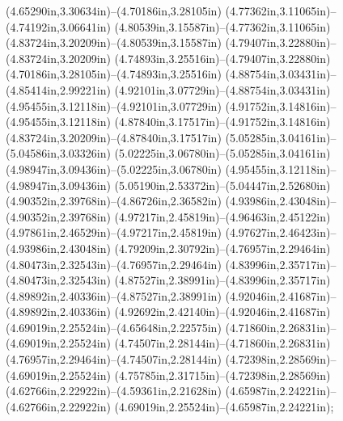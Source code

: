 (4.65290in,3.30634in)--(4.70186in,3.28105in) (4.77362in,3.11065in)--(4.74192in,3.06641in) (4.80539in,3.15587in)--(4.77362in,3.11065in) (4.83724in,3.20209in)--(4.80539in,3.15587in) (4.79407in,3.22880in)--(4.83724in,3.20209in) (4.74893in,3.25516in)--(4.79407in,3.22880in) (4.70186in,3.28105in)--(4.74893in,3.25516in) (4.88754in,3.03431in)--(4.85414in,2.99221in) (4.92101in,3.07729in)--(4.88754in,3.03431in) (4.95455in,3.12118in)--(4.92101in,3.07729in) (4.91752in,3.14816in)--(4.95455in,3.12118in) (4.87840in,3.17517in)--(4.91752in,3.14816in) (4.83724in,3.20209in)--(4.87840in,3.17517in) (5.05285in,3.04161in)--(5.04586in,3.03326in) (5.02225in,3.06780in)--(5.05285in,3.04161in) (4.98947in,3.09436in)--(5.02225in,3.06780in) (4.95455in,3.12118in)--(4.98947in,3.09436in) (5.05190in,2.53372in)--(5.04447in,2.52680in) (4.90352in,2.39768in)--(4.86726in,2.36582in) (4.93986in,2.43048in)--(4.90352in,2.39768in) (4.97217in,2.45819in)--(4.96463in,2.45122in) (4.97861in,2.46529in)--(4.97217in,2.45819in) (4.97627in,2.46423in)--(4.93986in,2.43048in) (4.79209in,2.30792in)--(4.76957in,2.29464in) (4.80473in,2.32543in)--(4.76957in,2.29464in) (4.83996in,2.35717in)--(4.80473in,2.32543in) (4.87527in,2.38991in)--(4.83996in,2.35717in) (4.89892in,2.40336in)--(4.87527in,2.38991in) (4.92046in,2.41687in)--(4.89892in,2.40336in) (4.92692in,2.42140in)--(4.92046in,2.41687in) (4.69019in,2.25524in)--(4.65648in,2.22575in) (4.71860in,2.26831in)--(4.69019in,2.25524in) (4.74507in,2.28144in)--(4.71860in,2.26831in) (4.76957in,2.29464in)--(4.74507in,2.28144in) (4.72398in,2.28569in)--(4.69019in,2.25524in) (4.75785in,2.31715in)--(4.72398in,2.28569in) (4.62766in,2.22922in)--(4.59361in,2.21628in) (4.65987in,2.24221in)--(4.62766in,2.22922in) (4.69019in,2.25524in)--(4.65987in,2.24221in);
